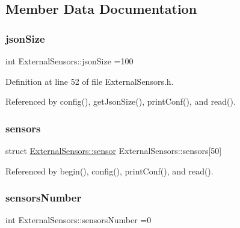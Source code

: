 \subsection{Member Data Documentation}
\mbox{\label{classExternalSensors_acacea86d74d967b57fcff282d26cff57}} 
\subsubsection{\texorpdfstring{json\+Size}{jsonSize}}
{\footnotesize\ttfamily int External\+Sensors\+::json\+Size =100\hspace{0.3cm}{\ttfamily [private]}}



Definition at line 52 of file External\+Sensors.\+h.



Referenced by config(), get\+Json\+Size(), print\+Conf(), and read().

\mbox{\label{classExternalSensors_a284233f884fcf00154a44740cf1d9e1e}} 
\subsubsection{\texorpdfstring{sensors}{sensors}}
{\footnotesize\ttfamily struct \hyperlink{structExternalSensors_1_1sensor}{External\+Sensors\+::sensor} External\+Sensors\+::sensors\mbox{[}50\mbox{]}\hspace{0.3cm}{\ttfamily [private]}}



Referenced by begin(), config(), print\+Conf(), and read().

\mbox{\label{classExternalSensors_a58e4fbf9adeae787d92be5fa33043b5d}} 
\subsubsection{\texorpdfstring{sensors\+Number}{sensorsNumber}}
{\footnotesize\ttfamily int External\+Sensors\+::sensors\+Number =0\hspace{0.3cm}{\ttfamily [private]}}



